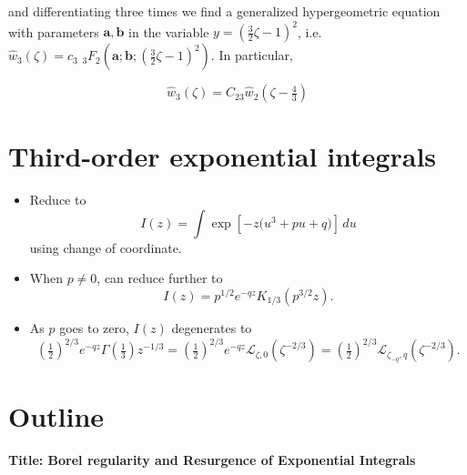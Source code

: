 \documentclass{article}
\theoremstyle{definition}
\newcommand{\laplace}{\mathcal{L}}
\begin{document}
and differentiating three times we find a generalized hypergeometric equation with parameters $\mathbf{a},\mathbf{b}$ in the variable $y=\left(\tfrac{3}{2}\zeta-1\right)^2$, i.e. $\hat{w}_3(\zeta)= c_3\,\, {}_3F_2\left(\mathbf{a};\mathbf{b};\left(\tfrac{3}{2}\zeta-1\right)^2\right)$. In particular, 

\begin{equation}
\hat{w}_3(\zeta)=C_{23}\hat{w}_2(\zeta-\tfrac{4}{3})
\end{equation}

\color{DarkTurquoise}

\section{Third-order exponential integrals}
\begin{itemize}
\item Reduce to
\[ I(z) = \int \exp\left[-z\big(u^3 + pu + q)\right]\,du \]
using change of coordinate.
\item When $p \neq 0$, can reduce further to
\[ I(z) = p^{1/2} e^{-qz} K_{1/3}(p^{3/2} z). \]
\item As $p$ goes to zero, $I(z)$ degenerates to
\[ \left(\tfrac{1}{2}\right)^{2/3} e^{-qz} \Gamma(\tfrac{1}{3}) z^{-1/3} = \left(\tfrac{1}{2}\right)^{2/3} e^{-qz} \laplace_{\zeta,0}(\zeta^{-2/3}) = \left(\tfrac{1}{2}\right)^{2/3} \laplace_{\zeta_{-q},q}(\zeta^{-2/3}). \]
\end{itemize}


\color{orange}
\section*{Outline}

\textbf{Title: Borel regularity and Resurgence of Exponential Integrals}
\end{document}
